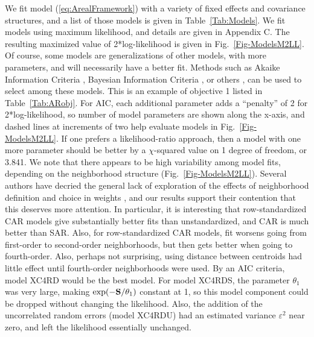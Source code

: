 \documentclass[11pt, titlepage]{article}\usepackage[]{graphicx}\usepackage[]{color}
\begin{document}
We fit model (\ref{eq:ArealFramework}) with a variety of fixed effects and covariance structures, and a list of those models is given in Table~\ref{Tab:Models}.  We fit models using maximum likelihood, and details are given in Appendix C. The resulting maximized value of 2*log-likelihood is given in Fig.~\ref{Fig-ModelsM2LL}. Of course, some models are generalizations of other models, with more parameters, and will necessarily have a better fit.  Methods such as Akaike Information Criteria \citep[AIC,][]{Akai:Info:1973}, Bayesian Information Criteria \citep[BIC,][]{Schw:esti:1978}, or others \citep[see, e.g.,][]{Burn:Ande:mode:2002,Hoot:Hobb:guid:2015}, can be used to select among these models. This is an example of objective 1 listed in Table~\ref{Tab:ARobj}. For AIC, each additional parameter adds a ``penalty'' of 2 for 2*log-likelihood, so number of model parameters are shown along the x-axis, and dashed lines at increments of two help evaluate models in Fig.~\ref{Fig-ModelsM2LL}.  If one prefers a likelihood-ratio approach, then a model with one more parameter should be better by a $\chi$-squared value on 1 degree of freedom, or 3.841. We note that there appears to be high variability among model fits, depending on the neighborhood structure (Fig.~\ref{Fig-ModelsM2LL}).  Several authors have decried the general lack of exploration of the effects of neighborhood definition and choice in weights \citep{Best:Cock:Benn:Wake:Elli:ecol:2001,Earn:Morg:Meng:Ryan:Summ:Bear:eval:2007}, and our results support their contention that this deserves more attention.  In particular, it is interesting that row-standardized CAR models give substantially better fits than unstandardized, and CAR is much better than SAR. Also, for row-standardized CAR models, fit worsens going from first-order to second-order neighborhoods, but then gets better when going to fourth-order.  Also, perhaps not surprising, using distance between centroids had little effect until fourth-order neighborhoods were used.  By an AIC criteria, model XC4RD would be the best model. For model XC4RDS, the parameter $\theta_1$ was very large, making $\exp(-\mathbf{S}/\theta_1)$ constant at 1, so this model component could be dropped without changing the likelihood.  Also, the addition of the uncorrelated random errors (model XC4RDU) had an estimated variance $\varepsilon^2$ near zero, and left the likelihood essentially unchanged. 
\end{document}
